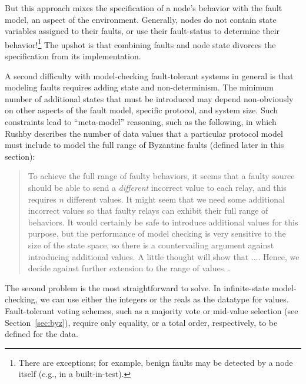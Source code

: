 \documentclass{llncs/llncs}
\begin{document}
\noindent
But this approach mixes the specification of a node's behavior with the fault model, an aspect of the environment. Generally, nodes do not contain state variables assigned to their faults, or use their fault-status to determine their behavior!\footnote{There are exceptions; for example, benign faults may be detected by a node itself (e.g., in a built-in-test).} The upshot is that combining faults and node state divorces the specification from its implementation.

A second difficulty with model-checking fault-tolerant systems in general is that modeling faults requires adding state and non-determinism. The minimum number of additional states that must be introduced may depend non-obviously on other aspects of the fault model, specific protocol, and system size. Such constraints lead to ``meta-model'' reasoning, such as the following, in which Rushby describes the number of data values that a particular protocol model must include to model the full range of Byzantine faults (defined later in this section):

\begin{quote}
To achieve the full range of faulty behaviors, it seems that a faulty source should be able to send a \emph{different} incorrect value to each relay, and this requires $n$ different values. It might seem that we need some additional incorrect values so that faulty relays can exhibit their full range of behaviors. It would certainly be safe to introduce additional values for this purpose, but the performance of model checking is very sensitive to the size of the state space, so there is a countervailing argument against introducing additional values. A little thought will show that $\ldots$. Hence, we decide against further extension to the range of values~\cite{Rushby:OM1}.
\end{quote}

The second problem is the most straightforward to solve. In infinite-state model-checking, we can use either the integers or the reals as the datatype for values. Fault-tolerant voting schemes, such as a majority vote or mid-value selection (see Section~\ref{sec:byz}), require only equality, or a total order, respectively, to be defined for the data.
\end{document}
